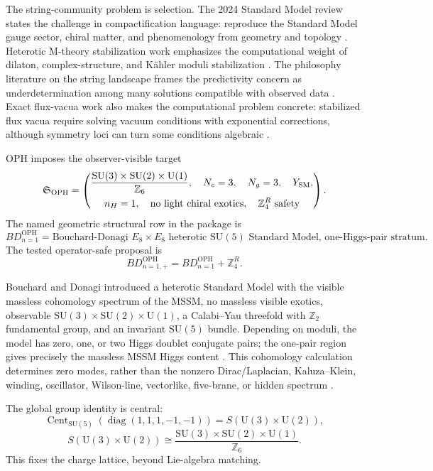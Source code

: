 \documentclass[11pt]{article}
\theoremstyle{remark}
\theoremstyle{plain}
\newcommand{\OPH}{\mathrm{OPH}}
\newcommand{\SU}{\mathrm{SU}}
\newcommand{\U}{\mathrm{U}}
\newcommand{\Cent}{\operatorname{Cent}}
\newcommand{\diag}{\operatorname{diag}}
\newcommand{\Z}{\mathbb Z}
\newcommand{\ZfourR}{\mathbb Z_4^R}
\begin{document}
The string-community problem is selection. The 2024 Standard Model review states the challenge in
compactification language: reproduce the Standard Model gauge sector, chiral matter, and
phenomenology from geometry and topology \cite{MarchesanoShiuWeigand2024}. Heterotic
M-theory stabilization work emphasizes the computational weight of dilaton, complex-structure,
and K\"ahler moduli stabilization \cite{DeffayetOvrutSteinhardt2024}. The philosophy literature
on the string landscape frames the predictivity concern as underdetermination among many
solutions compatible with observed data \cite{FriederichLeBihan2021}.
Exact flux-vacua work also makes the computational problem concrete: stabilized flux vacua
require solving vacuum conditions with exponential corrections, although symmetry loci can turn
some conditions algebraic \cite{GrimmVanDeHeisteeg2025}.

OPH imposes the observer-visible target
\[
\mathfrak S_{\OPH}=
\left(
\begin{gathered}
\dfrac{\SU(3)\times\SU(2)\times\U(1)}{\Z_6},\quad N_c=3,\quad N_g=3,\quad Y_{\rm SM},\\
n_H=1,\quad \text{no light chiral exotics},\quad \ZfourR\text{ safety}
\end{gathered}
\right).
\]
The named geometric structural row in the package is
\[
\boxed{
BD_{n=1}^{\OPH}
=
\text{Bouchard-Donagi }E_8\times E_8
\text{ heterotic }\SU(5)\text{ Standard Model, one-Higgs-pair stratum}.
}
\]
The tested operator-safe proposal is
\[
\boxed{
BD_{n=1,+}^{\OPH}
=
BD_{n=1}^{\OPH}+\ZfourR.
}
\]

Bouchard and Donagi introduced a heterotic Standard Model with the visible massless cohomology
spectrum of the MSSM, no massless visible exotics,
observable \(\SU(3)\times\SU(2)\times\U(1)\), a Calabi--Yau threefold with
\(\Z_2\) fundamental group, and an invariant \(\SU(5)\) bundle. Depending on moduli, the model
has zero, one, or two Higgs doublet conjugate pairs; the one-pair region gives precisely the
massless MSSM Higgs content \cite{BouchardDonagi2005}. This cohomology calculation determines
zero modes, rather than the nonzero Dirac/Laplacian, Kaluza--Klein, winding, oscillator,
Wilson-line, vectorlike, five-brane, or hidden spectrum
\cite{DonagiHeOvrutReinbacher2004}.

The global group identity is central:
\[
\Cent_{\SU(5)}(\diag(1,1,1,-1,-1))=S(\U(3)\times\U(2)),
\]
\[
S(\U(3)\times\U(2))
\cong
\frac{\SU(3)\times\SU(2)\times\U(1)}{\Z_6}.
\]
This fixes the charge lattice, beyond Lie-algebra matching.
\end{document}
